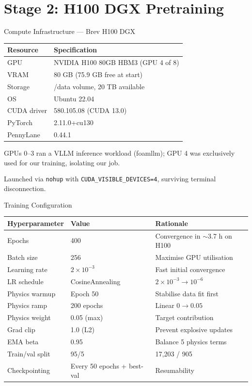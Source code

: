 \documentclass[aspectratio=169]{beamer}
\begin{document}
\section{Stage 2: H100 DGX Pretraining}

\begin{frame}{Compute Infrastructure --- Brev H100 DGX}
\begin{table}
\centering
\small
\begin{tabular}{ll}
\toprule
Resource & Specification \\
\midrule
GPU & NVIDIA H100 80GB HBM3 (GPU 4 of 8) \\
VRAM & 80 GB (75.9 GB free at start) \\
Storage & /data volume, 20 TB available \\
OS & Ubuntu 22.04 \\
CUDA driver & 580.105.08 (CUDA 13.0) \\
PyTorch & 2.11.0+cu130 \\
PennyLane & 0.44.1 \\
\bottomrule
\end{tabular}
\end{table}

GPUs 0--3 ran a VLLM inference workload (foamllm); GPU 4 was exclusively used for our training, isolating our job.

Launched via \texttt{nohup} with \texttt{CUDA\_VISIBLE\_DEVICES=4}, surviving terminal disconnection.
\end{frame}

\begin{frame}{Training Configuration}
\begin{table}
\centering
\small
\begin{tabular}{lll}
\toprule
Hyperparameter & Value & Rationale \\
\midrule
Epochs & 400 & Convergence in $\sim$3.7 h on H100 \\
Batch size & 256 & Maximise GPU utilisation \\
Learning rate & $2\times10^{-3}$ & Fast initial convergence \\
LR schedule & CosineAnnealing & $2\times10^{-3} \to 10^{-6}$ \\
Physics warmup & Epoch 50 & Stabilise data fit first \\
Physics ramp & 200 epochs & Linear $0 \to 0.05$ \\
Physics weight & 0.05 (max) & Target contribution \\
Grad clip & 1.0 (L2) & Prevent explosive updates \\
EMA beta & 0.95 & Balance 5 physics terms \\
Train/val split & 95/5 & 17,203 / 905 \\
Checkpointing & Every 50 epochs + best-val & Resumability \\
\bottomrule
\end{tabular}
\end{table}
\end{frame}
\end{document}
